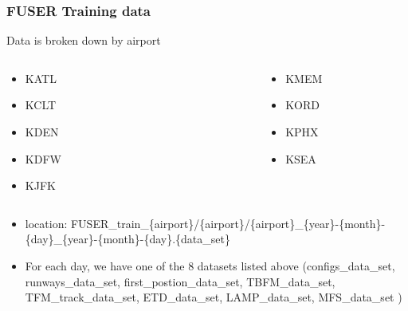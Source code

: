 \documentclass[11pt,xcolor={dvipsnames},hyperref={pdftex,pdfpagemode=UseNone,hidelinks,pdfdisplaydoctitle=true},usepdftitle=false]{beamer}
\begin{document}
\begin{frame}
	\frametitle{FUSER Training data}
	Data is broken down by airport
	\begin{columns}[totalwidth=\textwidth]
		\begin{column}[T]{0.48\textwidth}
			\begin{itemize}
				\item KATL
				\item KCLT
				\item KDEN
				\item KDFW
				\item KJFK
			\end{itemize}
		\end{column}
		\begin{column}[T]{0.04\textwidth}
		\end{column}
		\begin{column}[T]{0.48\textwidth}
			\begin{itemize}
				\item KMEM
				\item KORD
				\item KPHX
				\item KSEA
			\end{itemize}
		\end{column}
	\end{columns}
	\begin{itemize}
		\item location: FUSER\_train\_\{airport\}/\{airport\}/\{airport\}\_\{year\}-\{month\}-\{day\}\_\{year\}-\{month\}-\{day\}.\{data\_set\}
		\item For each day, we have one of the 8 datasets listed above (configs\_data\_set, runways\_data\_set, first\_postion\_data\_set, TBFM\_data\_set, TFM\_track\_data\_set, ETD\_data\_set, LAMP\_data\_set, MFS\_data\_set )
	\end{itemize}
\end{frame}
\end{document}
